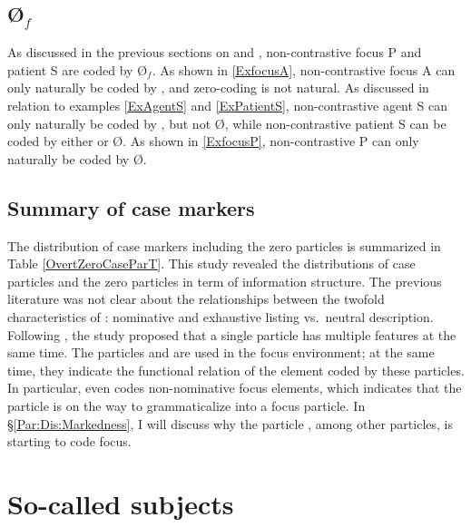 
\subsection{{\O$_{f}$}}\label{FocZero}

As discussed in the previous sections on  and ,
non-contrastive focus P and patient S are coded by {\O$_{f}$}.
As shown in \ref{ExfocusA},
non-contrastive focus A can only naturally be coded by ,
and zero-coding is not natural.
As discussed in relation to examples \ref{ExAgentS} and \ref{ExPatientS},
non-contrastive agent S can only naturally be coded by , but not {\O},
while non-contrastive patient S can be coded by either  or {\O}.
As shown in \ref{ExfocusP},
non-contrastive P can only naturally be coded by {\O}.

\subsection{Summary of case markers}

The distribution of case markers including the zero particles is summarized in Table \ref{OvertZeroCaseParT}.
This study revealed the distributions of case particles and the zero particles in term of information structure.
The previous literature was not clear about the relationships between the twofold characteristics of :
nominative and exhaustive listing vs.~neutral description.
Following ,
the study proposed that
a single particle has multiple features at the same time.
The particles  and  are used in the focus environment;
at the same time, they indicate the functional relation of the element coded by these particles.
In particular,  even codes non-nominative focus elements,
which indicates that the particle is on the way to grammaticalize into a focus particle.
In \S \ref{Par:Dis:Markedness},
I will discuss why the particle , among other particles,
is starting to code focus.

\section{So-called subjects}\label{Par:ArgStr}

